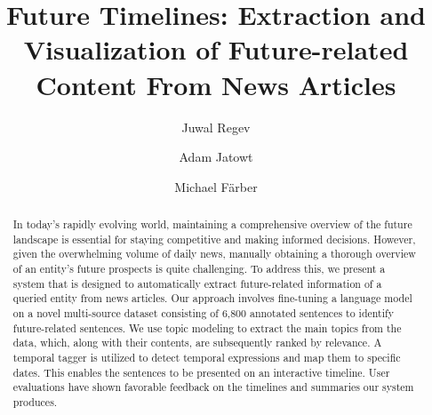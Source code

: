 \documentclass[sigconf]{acmart}
\begin{document}
\title{Future Timelines: Extraction and Visualization of Future-related Content  From News Articles}

\author{Juwal Regev}

\author{Adam Jatowt}

\author{Michael Färber}



\begin{abstract}
In today's rapidly evolving world, maintaining a comprehensive overview of the future landscape is essential for staying competitive and making informed decisions. However, given the overwhelming volume of daily news, manually obtaining a thorough overview of an entity's future prospects is quite challenging. To address this, we present a system that is designed to automatically extract future-related information of a queried entity from news articles. Our approach involves fine-tuning a language model on a novel multi-source dataset consisting of 6,800 annotated sentences to identify future-related sentences. We use topic modeling to extract the main topics from the data, which, along with their contents, are subsequently ranked by relevance. A temporal tagger is utilized to detect temporal expressions and map them to specific dates. This enables the sentences to be presented on an interactive timeline. User evaluations have shown favorable feedback on the timelines and summaries our system produces.
\end{abstract}
\end{document}
